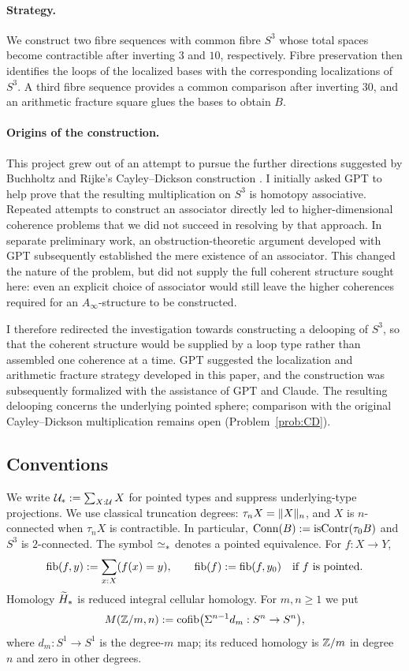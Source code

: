 \paragraph{Strategy.}
We construct two fibre sequences with common fibre $S^3$ whose total spaces become contractible after inverting $3$ and $10$, respectively. Fibre preservation then identifies the loops of the localized bases with the corresponding localizations of $S^3$. A third fibre sequence provides a common comparison after inverting $30$, and an arithmetic fracture square glues the bases to obtain $B$.

\paragraph{Origins of the construction.}
This project grew out of an attempt to pursue the further directions suggested by Buchholtz and Rijke's Cayley--Dickson construction \cite{cayley}. I initially asked GPT to help prove that the resulting multiplication on $S^3$ is homotopy associative. Repeated attempts to construct an associator directly led to higher-dimensional coherence problems that we did not succeed in resolving by that approach. In separate preliminary work, an obstruction-theoretic argument developed with GPT subsequently established the mere existence of an associator. This changed the nature of the problem, but did not supply the full coherent structure sought here: even an explicit choice of associator would still leave the higher coherences required for an $A_\infty$-structure to be constructed.

I therefore redirected the investigation towards constructing a delooping of $S^3$, so that the coherent structure would be supplied by a loop type rather than assembled one coherence at a time. GPT suggested the localization and arithmetic fracture strategy developed in this paper, and the construction was subsequently formalized with the assistance of GPT and Claude. The resulting delooping concerns the underlying pointed sphere; comparison with the original Cayley--Dickson multiplication remains open (Problem~\ref{prob:CD}).

\subsection*{Conventions}
We write $\Pointed:=\sum_{X:\mathcal U}X$ for pointed types and suppress underlying-type projections. We use classical truncation degrees: $\tau_nX=\trunc nX$, and $X$ is $n$-connected when $\tau_nX$ is contractible. In particular, $\Conn(B):=\isContr(\tau_0B)$ and $S^3$ is $2$-connected. The symbol $\eqp$ denotes a pointed equivalence. For $f:X\to Y$,
\[
\fib(f,y):=\sum_{x:X}(f(x)=y),
\qquad
\fib(f):=\fib(f,y_0)\quad\text{if $f$ is pointed}.
\]
Homology $\HH_*$ is reduced integral cellular homology. For $m,n\geq1$ we put
\[
\Moore mn:=\cofib\bigl(\Sigma^{n-1}d_m:S^n\to S^n\bigr),
\]
where $d_m:S^1\to S^1$ is the degree-$m$ map; its reduced homology is $\Z/m$ in degree $n$ and zero in other degrees.

